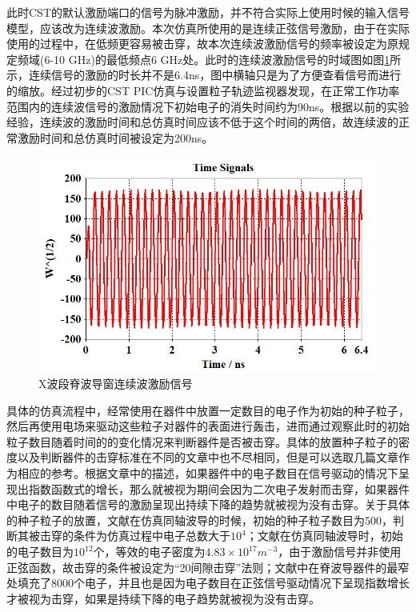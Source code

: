 \documentclass[master]{thesis-uestc}
\begin{document}
此时CST的默认激励端口的信号为脉冲激励，并不符合实际上使用时候的输入信号模型，应该改为连续波激励。本次仿真所使用的是连续正弦信号激励，由于在实际使用的过程中，在低频更容易被击穿，故本次连续波激励信号的频率被设定为原规定频域(6-10 GHz)的最低频点6 GHz处。此时的连续波激励信号的时域图如图\ref{fig:X波导窗连续波激励信号}所示，连续信号的激励的时长并不是6.4ns，图中横轴只是为了方便查看信号而进行的缩放。经过初步的CST PIC仿真与设置粒子轨迹监视器发现，在正常工作功率范围内的连续波信号的激励情况下初始电子的消失时间约为90ns。根据以前的实验经验，连续波的激励时间和总仿真时间应该不低于这个时间的两倍，故连续波的正常激励时间和总仿真时间被设定为200ns。
\begin{figure}[!htb]
    \centering
    \includegraphics[width=0.5\linewidth]{pic/chapter3/X波段脊波导窗连续波激励信号.png}
    \caption{X波段脊波导窗连续波激励信号}
    \label{fig:X波导窗连续波激励信号}
\end{figure}

具体的仿真流程中，经常使用在器件中放置一定数目的电子作为初始的种子粒子，然后再使用电场来驱动这些粒子对器件的表面进行轰击，进而通过观察此时的初始粒子数目随着时间的的变化情况来判断器件是否被击穿。具体的放置种子粒子的密度以及判断器件的击穿标准在不同的文章中也不尽相同，但是可以选取几篇文章作为相应的参考。根据文章\cite{li_2021_novel_multipactor}中的描述，如果器件中的电子数目在信号驱动的情况下呈现出指数函数式的增长，那么就被视为期间会因为二次电子发射而击穿，如果器件中电子的数目随着信号的激励呈现出持续下降的趋势就被视为没有击穿。关于具体的种子粒子的放置，文献\cite{gonzalez_2015_experimental}在仿真同轴波导的时候，初始的种子粒子数目为500，判断其被击穿的条件为仿真过程中电子总数大于$10^4$；文献\cite{gonzalez_2016_multipactor}在仿真同轴波导时，初始的电子数目为$10^{12}$个，等效的电子密度为$4.83 \times 10^{17} m^{-3}$，由于激励信号并非使用正弦函数，故击穿的条件被设定为“20间隙击穿”法则；文献\cite{you_2015_highly}中在脊波导器件的最窄处填充了8000个电子，并且也是因为电子数目在正弦信号驱动情况下呈现指数增长才被视为击穿，如果是持续下降的电子趋势就被视为没有击穿。
\end{document}
